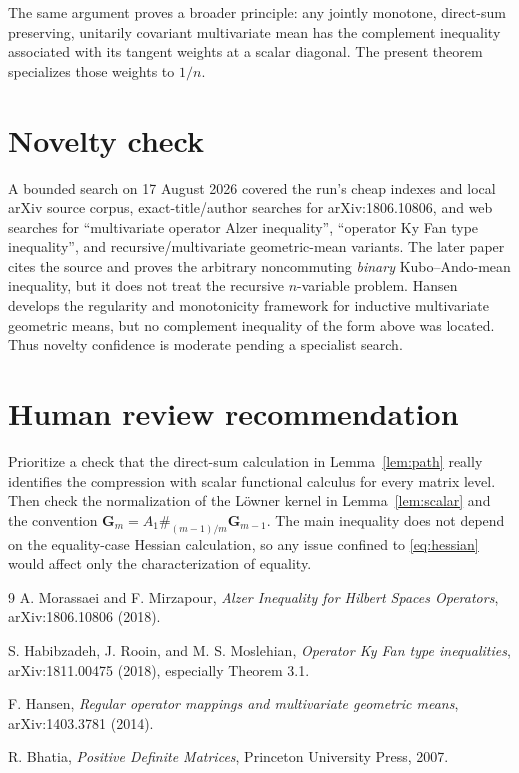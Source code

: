 \documentclass[11pt]{article}
\newcommand{\G}{\mathbf G}
\begin{document}
The same argument proves a broader principle: any jointly monotone,
direct-sum preserving, unitarily covariant multivariate mean has the
complement inequality associated with its tangent weights at a scalar
diagonal.  The present theorem specializes those weights to $1/n$.

\section{Novelty check}

A bounded search on 17 August 2026 covered the run's cheap indexes and local
arXiv source corpus, exact-title/author searches for arXiv:1806.10806, and web
searches for ``multivariate operator Alzer inequality'', ``operator Ky Fan
type inequality'', and recursive/multivariate geometric-mean variants.  The
later paper \cite{HRM} cites the source and proves the arbitrary
noncommuting \emph{binary} Kubo--Ando-mean inequality, but it does not treat
the recursive $n$-variable problem.  Hansen \cite{Hansen} develops the
regularity and monotonicity framework for inductive multivariate geometric
means, but no complement inequality of the form above was located.  Thus
novelty confidence is moderate pending a specialist search.

\section{Human review recommendation}

Prioritize a check that the direct-sum calculation in
Lemma~\ref{lem:path} really identifies the compression with scalar functional
calculus for every matrix level.  Then check the normalization of the
L\"owner kernel in Lemma~\ref{lem:scalar} and the convention
$\G_m=A_1\#_{(m-1)/m}\G_{m-1}$.  The main inequality does not depend on the
equality-case Hessian calculation, so any issue confined to
\eqref{eq:hessian} would affect only the characterization of equality.

\begin{thebibliography}{9}
A. Morassaei and F. Mirzapour,
\emph{Alzer Inequality for Hilbert Spaces Operators},
arXiv:1806.10806 (2018).

S. Habibzadeh, J. Rooin, and M. S. Moslehian,
\emph{Operator Ky Fan type inequalities},
arXiv:1811.00475 (2018), especially Theorem 3.1.

F. Hansen,
\emph{Regular operator mappings and multivariate geometric means},
arXiv:1403.3781 (2014).

R. Bhatia,
\emph{Positive Definite Matrices}, Princeton University Press, 2007.
\end{thebibliography}
\end{document}
